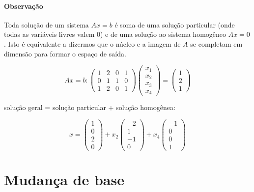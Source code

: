 \paragraph*{Observação} Toda solução de um sistema $Ax=b$ é soma de uma solução particular (onde todas as variáveis livres valem 0) e de uma solução ao sistema homogêneo $Ax=0$. Isto é equivalente a dizermos que o núcleo e a imagem de $A$ se completam em dimensão para formar o espaço de saída.
\begin{exemplo}
   \begin{equation*}
      Ax = b: \begin{pmatrix} 1 & 2 & 0 & 1\\ 0 & 1 & 1 & 0\\ 1 & 2 & 0 & 1\end{pmatrix}\begin{pmatrix} x_1\\x_2\\x_3\\x_4\end{pmatrix} = \begin{pmatrix} 1\\2\\1\end{pmatrix}
   \end{equation*}
   
   solução geral = solução particular + solução homogênea:

   \begin{equation*}
      x = \begin{pmatrix} 1\\0\\2\\0\end{pmatrix} + x_2 \begin{pmatrix}-2\\1\\-1\\0\end{pmatrix} + x_4\begin{pmatrix} -1\\0\\0\\1\end{pmatrix}
   \end{equation*}
\end{exemplo}

\section{Mudança de base}

